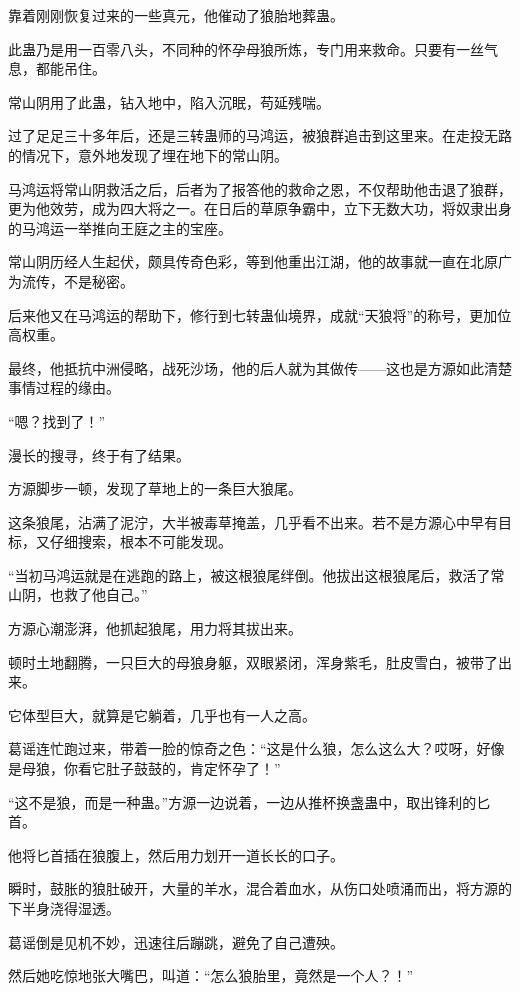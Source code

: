 \begin{this_body}
靠着刚刚恢复过来的一些真元，他催动了狼胎地葬蛊。

此蛊乃是用一百零八头，不同种的怀孕母狼所炼，专门用来救命。只要有一丝气息，都能吊住。

常山阴用了此蛊，钻入地中，陷入沉眠，苟延残喘。

过了足足三十多年后，还是三转蛊师的马鸿运，被狼群追击到这里来。在走投无路的情况下，意外地发现了埋在地下的常山阴。

马鸿运将常山阴救活之后，后者为了报答他的救命之恩，不仅帮助他击退了狼群，更为他效劳，成为四大将之一。在日后的草原争霸中，立下无数大功，将奴隶出身的马鸿运一举推向王庭之主的宝座。

常山阴历经人生起伏，颇具传奇色彩，等到他重出江湖，他的故事就一直在北原广为流传，不是秘密。

后来他又在马鸿运的帮助下，修行到七转蛊仙境界，成就“天狼将”的称号，更加位高权重。

最终，他抵抗中洲侵略，战死沙场，他的后人就为其做传——这也是方源如此清楚事情过程的缘由。

“嗯？找到了！”

漫长的搜寻，终于有了结果。

方源脚步一顿，发现了草地上的一条巨大狼尾。

这条狼尾，沾满了泥泞，大半被毒草掩盖，几乎看不出来。若不是方源心中早有目标，又仔细搜索，根本不可能发现。

“当初马鸿运就是在逃跑的路上，被这根狼尾绊倒。他拔出这根狼尾后，救活了常山阴，也救了他自己。”

方源心潮澎湃，他抓起狼尾，用力将其拔出来。

顿时土地翻腾，一只巨大的母狼身躯，双眼紧闭，浑身紫毛，肚皮雪白，被带了出来。

它体型巨大，就算是它躺着，几乎也有一人之高。

葛谣连忙跑过来，带着一脸的惊奇之色：“这是什么狼，怎么这么大？哎呀，好像是母狼，你看它肚子鼓鼓的，肯定怀孕了！”

“这不是狼，而是一种蛊。”方源一边说着，一边从推杯换盏蛊中，取出锋利的匕首。

他将匕首插在狼腹上，然后用力划开一道长长的口子。

瞬时，鼓胀的狼肚破开，大量的羊水，混合着血水，从伤口处喷涌而出，将方源的下半身浇得湿透。

葛谣倒是见机不妙，迅速往后蹦跳，避免了自己遭殃。

然后她吃惊地张大嘴巴，叫道：“怎么狼胎里，竟然是一个人？！”


\end{this_body}
